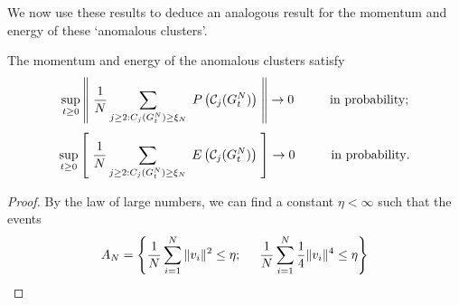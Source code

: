 We now use these results to deduce an analogous result for the momentum and energy of these `anomalous clusters'. \begin{corollary}\label{corr: anomalous clusters 3}  The momentum and energy of the anomalous clusters satisfy \begin{equation}
           \sup_{t\ge 0} \left\|\hspace{0.1cm}\frac{1}{N}\sum_{j\ge 2: C_j(G^N_t)\ge \xi_N} \hspace{0.1cm} P\left(\mathcal{C}_j(G^N_t)\right) \hspace{0.1cm}\right\| \rightarrow 0 \hspace{1cm} \text{in probability};
       \end{equation} \begin{equation}
           \sup_{t\ge 0} \left[\hspace{0.1cm}\frac{1}{N}\sum_{j\ge 2: C_j(G^N_t)\ge \xi_N} \hspace{0.1cm} E\left(\mathcal{C}_j(G^N_t)\right) \hspace{0.1cm}\right] \rightarrow 0 \hspace{1cm} \text{in probability}.
       \end{equation}   \end{corollary} \begin{proof} By the law of large numbers, we can find a constant $\eta<\infty$ such that the events \begin{equation}
        A_N =\left\{\frac{1}{N}\sum_{i=1}^N \|v_i\|^2 \le \eta;\hspace{0.5cm} \frac{1}{N}\sum_{i=1}^N \frac{1}{4}\|v_i\|^4\le \eta\right\}

\end{equation}
\end{proof}

